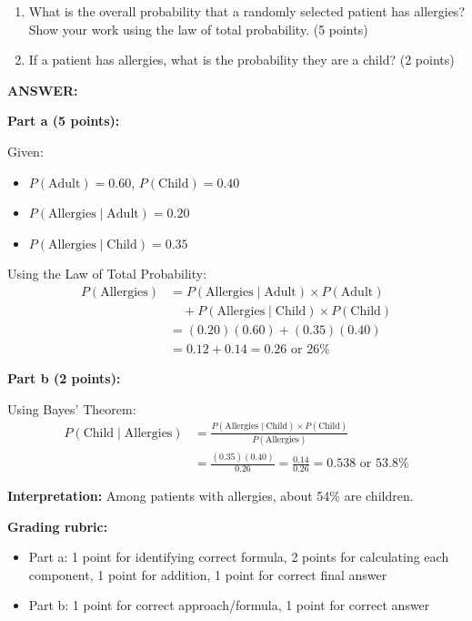 \documentclass[11pt]{article}
\begin{document}
\begin{enumerate}
    \item[a)] What is the overall probability that a randomly selected patient has allergies? Show your work using the law of total probability. (5 points)
    \item[b)] If a patient has allergies, what is the probability they are a child? (2 points)
\end{enumerate}

\textbf{ANSWER:}

\textbf{Part a (5 points):}

Given:
\begin{itemize}
    \item $P(\text{Adult}) = 0.60$, $P(\text{Child}) = 0.40$
    \item $P(\text{Allergies} \mid \text{Adult}) = 0.20$
    \item $P(\text{Allergies} \mid \text{Child}) = 0.35$
\end{itemize}

Using the Law of Total Probability:
\begin{align*}
P(\text{Allergies}) &= P(\text{Allergies} \mid \text{Adult}) \times P(\text{Adult})\\
&\quad + P(\text{Allergies} \mid \text{Child}) \times P(\text{Child})\\
&= (0.20)(0.60) + (0.35)(0.40)\\
&= 0.12 + 0.14 = 0.26 \text{ or } 26\%
\end{align*}

\textbf{Part b (2 points):}

Using Bayes' Theorem:
\begin{align*}
P(\text{Child} \mid \text{Allergies}) &= \frac{P(\text{Allergies} \mid \text{Child}) \times P(\text{Child})}{P(\text{Allergies})}\\
&= \frac{(0.35)(0.40)}{0.26} = \frac{0.14}{0.26} = 0.538 \text{ or } 53.8\%
\end{align*}

\textbf{Interpretation:} Among patients with allergies, about 54\% are children.

\textbf{Grading rubric:}
\begin{itemize}
    \item Part a: 1 point for identifying correct formula, 2 points for calculating each component, 1 point for addition, 1 point for correct final answer
    \item Part b: 1 point for correct approach/formula, 1 point for correct answer
\end{itemize}
\end{document}
